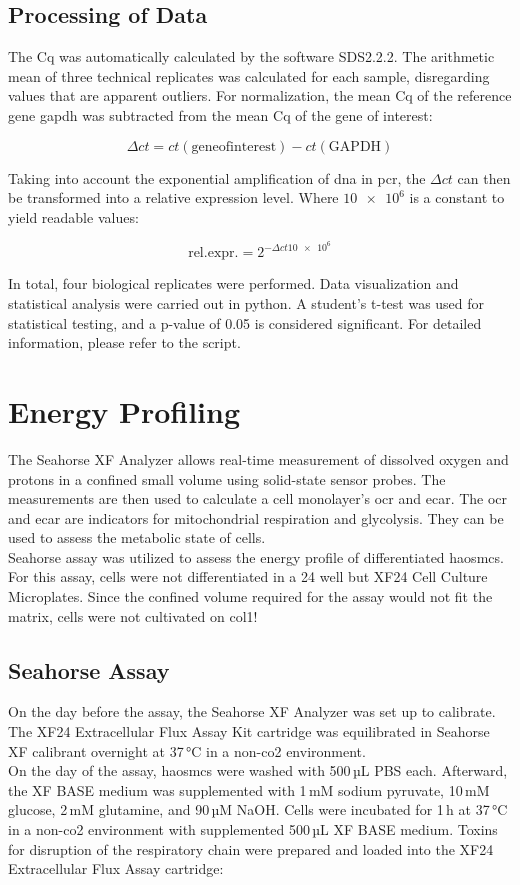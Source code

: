     \subsection{Processing of Data}
    The \ac{Cq} was automatically calculated by the software SDS2.2.2. The arithmetic mean of three technical replicates was calculated for each sample, disregarding values that are apparent outliers. For normalization, the mean \ac{Cq} of the reference gene \ac{gapdh} was subtracted from the mean \ac{Cq} of the gene of interest:

    $$\Delta ct = ct(\mathrm{gene of interest}) - ct(\mathrm{GAPDH})$$

    Taking into account the exponential amplification of \ac{dna} in \ac{pcr}, the $\Delta ct$ can then be transformed into a relative expression level. Where $\num{10e6}$ is a constant to yield readable values:

    $$\mathrm{rel. expr.} = 2^{-\Delta ct\num{10e6}}$$

    In total, four biological replicates were performed. Data visualization and statistical analysis were carried out in python. A student's t-test was used for statistical testing, and a p-value of 0.05 is considered significant. For detailed information, please refer to the script.

\section{Energy Profiling}
\label{sec:seahorse}
The Seahorse XF Analyzer allows real-time measurement of dissolved oxygen and protons in a confined small volume using solid-state sensor probes. The measurements are then used to calculate a cell monolayer's \ac{ocr} and \ac{ecar}. The \ac{ocr} and \ac{ecar} are indicators for mitochondrial respiration and glycolysis. They can be used to assess the metabolic state of cells. \cite{agilenttechnologiesHowAgilentSeahorse2022}\\
Seahorse assay was utilized to assess the energy profile of differentiated \acp{haosmc}. For this assay, cells were not differentiated in a \ac{24 well} but XF24 Cell Culture Microplates. Since the confined volume required for the assay would not fit the matrix, cells were not cultivated on \ac{col1}!

    \subsection{Seahorse Assay}
    On the day before the assay, the Seahorse XF Analyzer was set up to calibrate. The XF24 Extracellular Flux Assay Kit cartridge was equilibrated in Seahorse XF calibrant overnight at 37\,°C in a non-\ac{co2} environment.\\
    On the day of the assay, \acp{haosmc} were washed with 500\,µL PBS each. Afterward, the XF BASE medium was supplemented with 1\,mM sodium pyruvate, 10\,mM glucose, 2\,mM glutamine, and 90\,µM NaOH. Cells were incubated for 1\,h at 37\,°C in a non-\ac{co2} environment with supplemented 500\,µL XF BASE medium. Toxins for disruption of the respiratory chain were prepared and loaded into the XF24 Extracellular Flux Assay cartridge:

